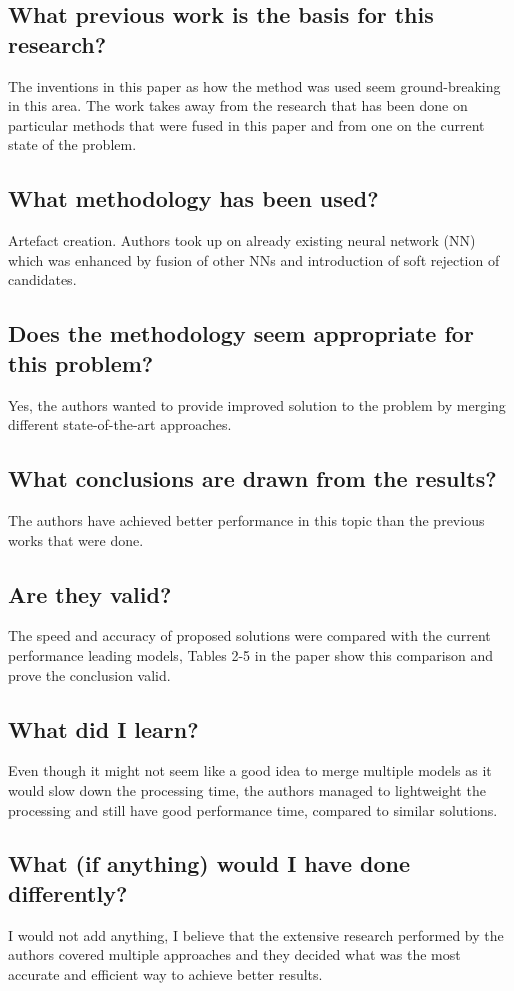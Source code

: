 \documentclass[11pt,a4paper]{article}
\begin{document}
\subsection*{What previous work is the basis for this research?}
The inventions in this paper as how the method was used seem ground-breaking in this area. The work takes away from the research that has been done on particular methods that were fused in this paper and from one on the current state of the problem.

\subsection*{What methodology has been used?}
Artefact creation. Authors took up on already existing neural network (NN) which was enhanced by fusion of other NNs and introduction of soft rejection of candidates.

\subsection*{Does the methodology seem appropriate for this problem?}
Yes, the authors wanted to provide improved solution to the problem by merging different state-of-the-art approaches.

\subsection*{What conclusions are drawn from the results?}
The authors have achieved better performance in this topic than the previous works that were done.

\subsection*{Are they valid?}
The speed and accuracy of proposed solutions were compared with the current performance leading models, Tables 2-5 in the paper show this comparison and prove the conclusion valid.

\subsection*{What did I learn?}
Even though it might not seem like a good idea to merge multiple models as it would slow down the processing time, the authors managed to lightweight the processing and still have good performance time, compared to similar solutions.

\subsection*{What (if anything) would I have done differently?}
I would not add anything, I believe that the extensive research performed by the authors covered multiple approaches and they decided what was the most accurate and efficient way to achieve better results.
\newpage 
\end{document}
